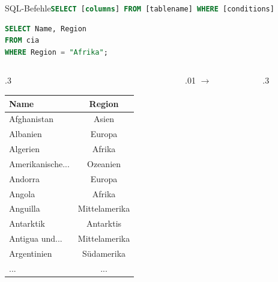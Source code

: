 \begin{frame}[fragile]{SQL-Befehle}{\lstinline[language=SQL]|SELECT [columns] FROM [tablename] WHERE [conditions]|}
  \begin{lstlisting}[language=SQL, basicstyle=\ttfamily\scriptsize]
SELECT Name, Region
FROM cia
WHERE Region = "Afrika";
\end{lstlisting}

  \begin{columns}[c]
    \centering
    \begin{column}{.3\textwidth}
      \begin{table}
        \centering
        \tiny
        \begin{tabular}{lc}
          \toprule
          \textbf{Name}                & \textbf{Region} \\
          \midrule
          Afghanistan                  & Asien           \\
          Albanien                     & Europa          \\
          \rowcolor[gray]{.8} Algerien & Afrika          \\
          Amerikanische...             & Ozeanien        \\
          Andorra                      & Europa          \\
          \rowcolor[gray]{.8} Angola   & Afrika          \\
          Anguilla                     & Mittelamerika   \\
          Antarktik                    & Antarktis       \\
          Antigua und...               & Mittelamerika   \\
          Argentinien                  & Südamerika      \\
          \midrule
          ...                          & ...             \\
          \bottomrule
        \end{tabular}
      \end{table}
    \end{column}
    \begin{column}{.01\textwidth}
      $\rightarrow$
    \end{column}
    \begin{column}{.3\textwidth}
      \begin{table}
        \centering
        \tiny
        \begin{tabular}{lc}
          \toprule

\end{tabular}
\end{table}
\end{column}
\end{columns}
\end{frame}
